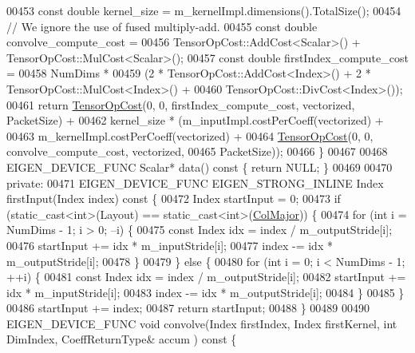 \begin{DoxyCode}
00453     \textcolor{keyword}{const} \textcolor{keywordtype}{double} kernel\_size = m\_kernelImpl.dimensions().TotalSize();
00454     \textcolor{comment}{// We ignore the use of fused multiply-add.}
00455     \textcolor{keyword}{const} \textcolor{keywordtype}{double} convolve\_compute\_cost =
00456         TensorOpCost::AddCost<Scalar>() + TensorOpCost::MulCost<Scalar>();
00457     \textcolor{keyword}{const} \textcolor{keywordtype}{double} firstIndex\_compute\_cost =
00458         NumDims *
00459         (2 * TensorOpCost::AddCost<Index>() + 2 * TensorOpCost::MulCost<Index>() +
00460          TensorOpCost::DivCost<Index>());
00461     \textcolor{keywordflow}{return} \hyperlink{class_eigen_1_1_tensor_op_cost}{TensorOpCost}(0, 0, firstIndex\_compute\_cost, vectorized, PacketSize) +
00462            kernel\_size * (m\_inputImpl.costPerCoeff(vectorized) +
00463                           m\_kernelImpl.costPerCoeff(vectorized) +
00464                           \hyperlink{class_eigen_1_1_tensor_op_cost}{TensorOpCost}(0, 0, convolve\_compute\_cost, vectorized,
00465                                        PacketSize));
00466   \}
00467 
00468   EIGEN\_DEVICE\_FUNC Scalar* data()\textcolor{keyword}{ const }\{ \textcolor{keywordflow}{return} NULL; \}
00469 
00470  \textcolor{keyword}{private}:
00471   EIGEN\_DEVICE\_FUNC EIGEN\_STRONG\_INLINE Index firstInput(Index index)\textcolor{keyword}{ const }\{
00472     Index startInput = 0;
00473     \textcolor{keywordflow}{if} (static\_cast<int>(Layout) == static\_cast<int>(\hyperlink{group__enums_ggaacded1a18ae58b0f554751f6cdf9eb13a0cbd4bdd0abcfc0224c5fcb5e4f6669a}{ColMajor})) \{
00474       \textcolor{keywordflow}{for} (\textcolor{keywordtype}{int} i = NumDims - 1; i > 0; --i) \{
00475         \textcolor{keyword}{const} Index idx = index / m\_outputStride[i];
00476         startInput += idx * m\_inputStride[i];
00477         index -= idx * m\_outputStride[i];
00478       \}
00479     \} \textcolor{keywordflow}{else} \{
00480       \textcolor{keywordflow}{for} (\textcolor{keywordtype}{int} i = 0; i < NumDims - 1; ++i) \{
00481         \textcolor{keyword}{const} Index idx = index / m\_outputStride[i];
00482         startInput += idx * m\_inputStride[i];
00483         index -= idx * m\_outputStride[i];
00484       \}
00485     \}
00486     startInput += index;
00487     \textcolor{keywordflow}{return} startInput;
00488   \}
00489 
00490   EIGEN\_DEVICE\_FUNC \textcolor{keywordtype}{void} convolve(Index firstIndex, Index firstKernel, \textcolor{keywordtype}{int} DimIndex, CoeffReturnType& accum
      )\textcolor{keyword}{ const }\{

\end{DoxyCode}
